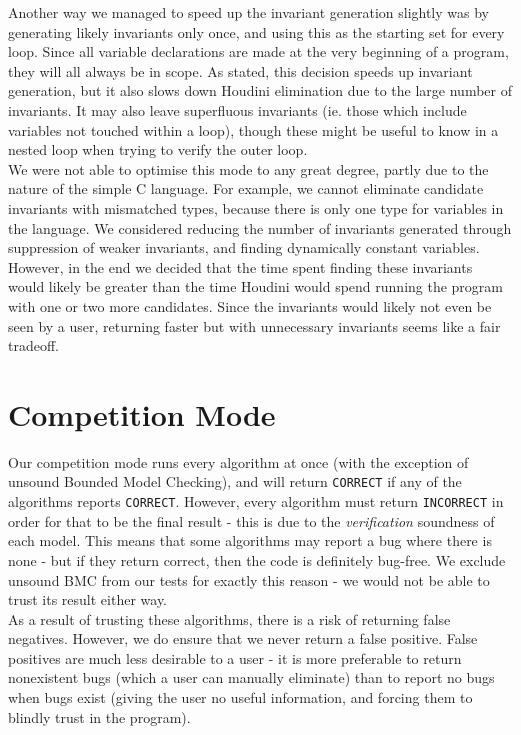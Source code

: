\documentclass[11pt]{article}
\begin{document}
Another way we managed to speed up the invariant generation slightly was by generating likely invariants only once, and using this as the starting set for every loop. Since all variable declarations are made at the very beginning of a program, they will all always be in scope. As stated, this decision speeds up invariant generation, but it also slows down Houdini elimination due to the large number of invariants. It may also leave superfluous invariants (ie. those which include variables not touched within a loop), though these might be useful to know in a nested loop when trying to verify the outer loop. \\

We were not able to optimise this mode to any great degree, partly due to the nature of the simple C language. For example, we cannot eliminate candidate invariants with mismatched types, because there is only one type for variables in the language. We considered reducing the number of invariants generated through suppression of weaker invariants, and finding dynamically constant variables. However, in the end we decided that the time spent finding these invariants would likely be greater than the time Houdini would spend running the program with one or two more candidates. Since the invariants would likely not even be seen by a user, returning faster but with unnecessary invariants seems like a fair tradeoff. \\

\section{Competition Mode}

Our competition mode runs every algorithm at once (with the exception of unsound Bounded Model Checking), and will return \verb|CORRECT| if any of the algorithms reports \verb|CORRECT|. However, every algorithm must return \verb|INCORRECT| in order for that to be the final result - this is due to the \emph{verification} soundness of each model. This means that some algorithms may report a bug where there is none - but if they return correct, then the code is definitely bug-free. We exclude unsound BMC from our tests for exactly this reason - we would not be able to trust its result either way. \\

As a result of trusting these algorithms, there is a risk of returning false negatives. However, we do ensure that we never return a false positive. False positives are much less desirable to a user - it is more preferable to return nonexistent bugs (which a user can manually eliminate) than to report no bugs when bugs exist (giving the user no useful information, and forcing them to blindly trust in the program). \\
\end{document}
